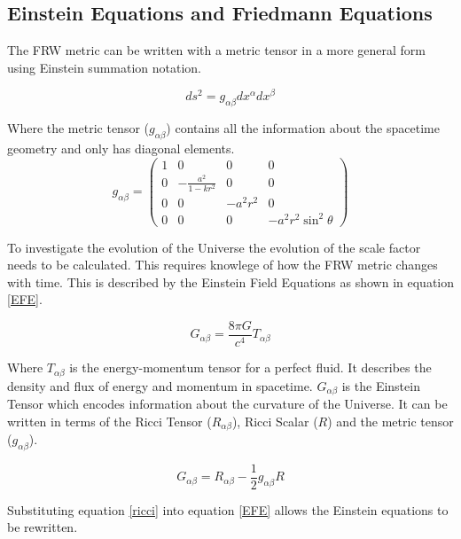 \documentclass[12pt]{article} %
\begin{document}
\subsection{Einstein Equations and Friedmann Equations}

The FRW metric can be written with a metric tensor in a more general form using Einstein summation notation.

\begin{equation}\label{metric}
ds^2 = g_{\alpha \beta}dx^\alpha dx^\beta
\end{equation}

Where the metric tensor ($g_{\alpha \beta}$) contains all the information about the spacetime geometry and only has diagonal elements.
\begin{equation}
g_{\alpha \beta} =
 \begin{pmatrix}
  1 & 0 & 0 & 0 \\
  0 & -\frac{a^2}{1-k r^2} & 0 & 0 \\
  0  & 0  & -a^2 r^2 & 0  \\
  0 & 0 & 0 & -a^2 r^2 \sin^2 \theta
 \end{pmatrix}
 \end{equation}

To investigate the evolution of the Universe the evolution of the scale factor needs to be calculated. This requires knowlege of how the FRW metric changes with time. This is  described by the Einstein Field Equations as shown in equation \ref{EFE}.

\begin{equation}\label{EFE}
G_{\alpha \beta} = \frac{8 \pi G}{c^4}T_{\alpha \beta}
\end{equation}

Where $T_{\alpha \beta}$ is the energy-momentum tensor for a perfect fluid. It describes the density and flux of energy and momentum in spacetime. $G_{\alpha \beta}$ is the Einstein Tensor which encodes information about the curvature of the Universe. It can be written in terms of the Ricci Tensor ($R_{\alpha \beta}$), Ricci Scalar ($R$) and the metric tensor ($g_{\alpha \beta}$)\cite{coles}.

\begin{equation}\label{ricci}
G_{\alpha \beta} = R_{\alpha \beta} - \frac{1}{2} g_{\alpha \beta} R
\end{equation}

Substituting equation \ref{ricci} into equation \ref{EFE} allows the Einstein equations to be rewritten.
\end{document}
